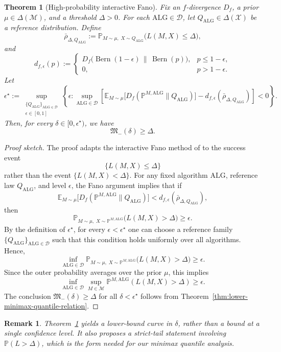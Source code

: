 \documentclass[journal]{IEEEtran}
\newtheorem{theorem}{Theorem}
\newtheorem{remark}{Remark}
\newcommand{\Bern}{\operatorname{Bern}}
\newcommand{\ALG}{\mathrm{ALG}}
\begin{document}
\begin{theorem}[High-probability interactive Fano]
\label{thm:hp-interactive-fano}
Fix an \(f\)-divergence \(D_f\), a prior \(\mu\in\Delta(\mathcal M)\), and a
threshold \(\Delta>0\). For each \(\ALG\in\mathcal D\), let
\(Q_\ALG\in\Delta(\mathcal X)\) be a reference distribution. Define
\[
\bar\rho_{\Delta,Q_\ALG}
:=
\mathbb P_{M\sim\mu,\;X\sim Q_\ALG}
\bigl(L(M,X)\le \Delta\bigr),
\]
and
\[
d_{f,\epsilon}(p)
:=
\begin{cases}
D_f\bigl(\Bern(1-\epsilon)\,\|\,\Bern(p)\bigr),
& p\le 1-\epsilon,\\[0.75ex]
0, & p>1-\epsilon.
\end{cases}
\]
Let
\[
\epsilon^\star
:=
\sup_{\substack{\{Q_\ALG\}_{\ALG\in\mathcal D}\\ \epsilon\in[0,1]}}
\left\{
\epsilon:
\sup_{\ALG\in\mathcal D}
\left[
\mathbb E_{M\sim\mu}
\bigl[
D_f(\mathbb P^{M,\ALG}\|Q_\ALG)
\bigr]
-
d_{f,\epsilon}(\bar\rho_{\Delta,Q_\ALG})
\right]
<0
\right\}.
\]
Then, for every \(\delta\in[0,\epsilon^\star)\), we have
\[
\mathfrak M_{-}(\delta)\ge \Delta.
\]
\end{theorem}

\begin{proof}[Proof sketch]
The proof adapts the interactive Fano method of
\cite[Thm.~2]{chen2024assouad} to the success event
\[
\{L(M,X)\le \Delta\}
\]
rather than the event \(\{L(M,X)<\Delta\}\). For any fixed algorithm
\(\ALG\), reference law \(Q_\ALG\), and level \(\epsilon\), the Fano argument
implies that if
\[
\mathbb E_{M\sim\mu}
\bigl[
D_f(\mathbb P^{M,\ALG}\|Q_\ALG)
\bigr]
<
d_{f,\epsilon}(\bar\rho_{\Delta,Q_\ALG}),
\]
then
\[
\mathbb P_{M\sim\mu,\;X\sim \mathbb P^{M,\ALG}}
\bigl(L(M,X)>\Delta\bigr)
\ge \epsilon.
\]
By the definition of \(\epsilon^\star\), for every
\(\epsilon<\epsilon^\star\) one can choose a reference family
\(\{Q_\ALG\}_{\ALG\in\mathcal D}\) such that this condition holds uniformly
over all algorithms. Hence,
\[
\inf_{\ALG\in\mathcal D}
\mathbb P_{M\sim\mu,\;X\sim \mathbb P^{M,\ALG}}
\bigl(L(M,X)>\Delta\bigr)
\ge \epsilon.
\]
Since the outer probability averages over the prior \(\mu\), this implies
\[
\inf_{\ALG\in\mathcal D}
\sup_{M\in\mathcal M}
\mathbb P^{M,\ALG}(L(M,X)>\Delta)
\ge \epsilon.
\]
The conclusion \(\mathfrak M_{-}(\delta)\ge \Delta\) for all
\(\delta<\epsilon^\star\) follows from
Theorem~\ref{thm:lower-minimax-quantile-relation}.
\end{proof}

\begin{remark}
 Theorem~\ref{thm:hp-interactive-fano} yields a lower-bound curve in \(\delta\), rather than a bound at a single confidence level. It also proposes a \emph{strict-tail} statement involving \(\mathbb P(L>\Delta)\), which is the form needed for our minimax quantile analysis.
\end{remark}
\end{document}
